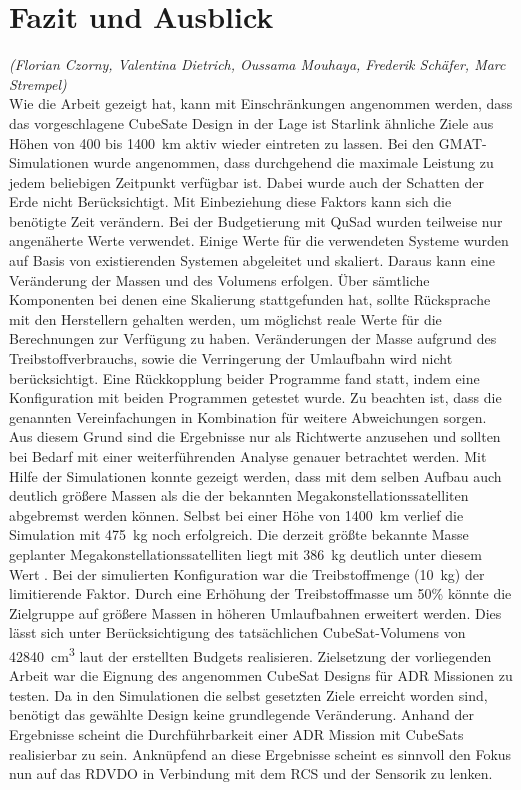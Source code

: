 \chapter{Fazit und Ausblick}
	\hfill\emph{(Florian Czorny, Valentina Dietrich, Oussama Mouhaya, Frederik Schäfer, Marc Strempel)}	\\
Wie die Arbeit gezeigt hat, kann mit Einschränkungen angenommen werden, dass das vorgeschlagene CubeSate Design in der Lage ist Starlink ähnliche Ziele aus Höhen von \num{400} bis \SI{1400}{\km} aktiv wieder eintreten zu lassen. Bei den GMAT-Simulationen wurde angenommen, dass durchgehend die maximale Leistung zu jedem beliebigen Zeitpunkt verfügbar ist. Dabei wurde auch der Schatten der Erde nicht Berücksichtigt. Mit Einbeziehung diese Faktors kann sich die benötigte Zeit verändern. Bei der Budgetierung mit QuSad wurden teilweise nur angenäherte Werte verwendet. Einige Werte für die verwendeten Systeme wurden auf Basis von existierenden Systemen abgeleitet und skaliert. Daraus kann eine Veränderung der Massen und des Volumens erfolgen. Über sämtliche Komponenten bei denen eine Skalierung stattgefunden hat, sollte Rücksprache mit den Herstellern gehalten werden, um möglichst reale Werte für die Berechnungen zur Verfügung zu haben.  Veränderungen der Masse aufgrund des Treibstoffverbrauchs, sowie die Verringerung der Umlaufbahn  wird nicht berücksichtigt. Eine Rückkopplung beider Programme fand statt, indem eine Konfiguration mit beiden Programmen getestet wurde. Zu beachten ist, dass die genannten Vereinfachungen in Kombination für weitere Abweichungen sorgen. Aus diesem Grund sind die Ergebnisse nur als Richtwerte anzusehen und sollten bei Bedarf mit einer weiterführenden Analyse genauer betrachtet werden. Mit Hilfe der Simulationen konnte gezeigt werden, dass mit dem selben Aufbau auch deutlich größere Massen als die der bekannten Megakonstellationssatelliten abgebremst werden können. Selbst bei einer Höhe von \SI{1400}{\km} verlief die Simulation mit \SI{475}{\kilogram} noch erfolgreich. Die derzeit größte bekannte Masse geplanter Megakonstellationssatelliten liegt mit \SI{386}{\kilogram} deutlich unter diesem Wert \cite{BenLarbi.2017}. Bei der simulierten Konfiguration war die Treibstoffmenge (\SI{10}{\kilogram}) der limitierende Faktor. Durch eine Erhöhung der Treibstoffmasse um \num{50}\% könnte die Zielgruppe auf größere Massen in höheren Umlaufbahnen erweitert werden. Dies lässt sich unter Berücksichtigung des tatsächlichen CubeSat-Volumens von \SI{42840}{\cubic\cm} laut der erstellten Budgets realisieren.  Zielsetzung der vorliegenden Arbeit war die Eignung des angenommen CubeSat Designs für ADR Missionen zu testen. Da in den Simulationen die selbst gesetzten Ziele erreicht worden sind, benötigt das gewählte Design keine grundlegende Veränderung. Anhand der Ergebnisse scheint die Durchführbarkeit einer ADR Mission mit CubeSats realisierbar zu sein. Anknüpfend an diese Ergebnisse scheint es sinnvoll den Fokus nun auf das RDVDO in Verbindung mit dem RCS und der Sensorik zu lenken.